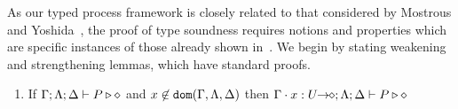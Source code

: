 %
%
%
As our typed process framework is closely related to that considered
by Mostrous and Yoshida~\cite{MostrousY15}, the proof of type soundness requires notions
and properties which are specific instances of those already shown in~\cite{MostrousY15}.
We begin by stating weakening and strengthening lemmas,
which have standard proofs.

\begin{lemma}\rm
	\label{l:weak}
	\begin{enumerate}[$-$]
		\item	If $\Gamma; \Lambda; \Delta \vdash P \triangleright \diamond$
			and
			$x \not\in \mathtt{dom}(\Gamma,\Lambda,\Delta)$
			then
			$\Gamma\cdot x: U\!\! \rightarrow\!\! \diamond; \Lambda; \Delta \vdash P \triangleright \diamond$ 
	\end{enumerate}
\end{lemma}

